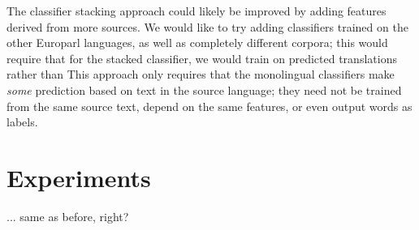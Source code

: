 The classifier stacking approach could likely be improved by adding features
derived from more sources.
We would like to try adding classifiers trained on the other Europarl
languages, as well as completely different corpora; this would require that for
the stacked classifier, we would train on predicted translations rather than
This approach only requires that the monolingual classifiers make \emph{some}
prediction based on text in the source language;
they need not be trained from the same source text, depend on the same
features, or even output words as labels.

\section{Experiments}
... same as before, right?
